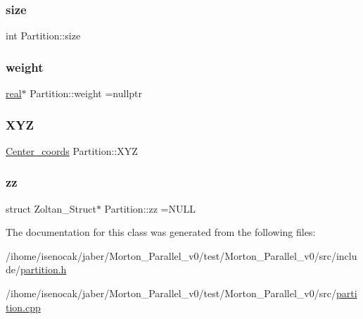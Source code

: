 \mbox{\label{classPartition_a718bdba639f222d90d23480b58caa1f9}} 
\subsubsection{\texorpdfstring{size}{size}}
{\footnotesize\ttfamily int Partition\+::size\hspace{0.3cm}{\ttfamily [private]}}

\mbox{\label{classPartition_a9371a86039815d9e187a8e414c94d372}} 
\subsubsection{\texorpdfstring{weight}{weight}}
{\footnotesize\ttfamily \mbox{\hyperlink{definitions_8h_aedc0ad84d1e764530814f57ad931d02a}{real}}$\ast$ Partition\+::weight =nullptr\hspace{0.3cm}{\ttfamily [private]}}

\mbox{\label{classPartition_af4ec081f50a82bac1899e1729a92dcc8}} 
\subsubsection{\texorpdfstring{X\+YZ}{XYZ}}
{\footnotesize\ttfamily \mbox{\hyperlink{typedefs_8h_a3ad6a5c3a7054ba718206a93e3af25b7}{Center\+\_\+coords}} Partition\+::\+X\+YZ\hspace{0.3cm}{\ttfamily [private]}}

\mbox{\label{classPartition_a22c16cf67f6139f29e52b04ae03f22da}} 
\subsubsection{\texorpdfstring{zz}{zz}}
{\footnotesize\ttfamily struct Zoltan\+\_\+\+Struct$\ast$ Partition\+::zz =N\+U\+LL\hspace{0.3cm}{\ttfamily [private]}}



The documentation for this class was generated from the following files\+:\begin{DoxyCompactItemize}
\item 
/ihome/isenocak/jaber/\+Morton\+\_\+\+Parallel\+\_\+v0/test/\+Morton\+\_\+\+Parallel\+\_\+v0/src/include/\mbox{\hyperlink{partition_8h}{partition.\+h}}\item 
/ihome/isenocak/jaber/\+Morton\+\_\+\+Parallel\+\_\+v0/test/\+Morton\+\_\+\+Parallel\+\_\+v0/src/\mbox{\hyperlink{partition_8cpp}{partition.\+cpp}}\end{DoxyCompactItemize}
